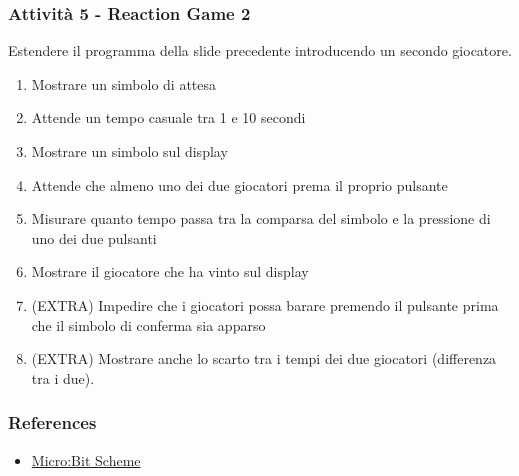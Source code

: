 \documentclass{beamer}
\begin{document}
\begin{frame}
	\frametitle{Attività 5 - Reaction Game 2}
	Estendere il programma della slide precedente introducendo un secondo giocatore.\\
	
	\vspace{0.5em}
	\begin{enumerate}
		\item Mostrare un simbolo di attesa
		\item Attende un tempo casuale tra 1 e 10 secondi
		\item Mostrare un simbolo sul display
		\item Attende che almeno uno dei due giocatori prema il proprio pulsante
		\item Misurare quanto tempo passa tra la comparsa del simbolo e la pressione di uno dei due pulsanti
		\item Mostrare il giocatore che ha vinto sul display
		\item (EXTRA) Impedire che i giocatori possa barare premendo il pulsante prima che il simbolo di conferma sia apparso
		\item (EXTRA) Mostrare anche lo scarto tra i tempi dei due giocatori (differenza tra i due).
	\end{enumerate}	
\end{frame}

\begin{frame}
	\frametitle{References}
	\begin{itemize}
		\item \href{https://microbit.org/get-started/user-guide/overview/}{Micro:Bit Scheme}
	\end{itemize}
\end{frame}
\end{document}
